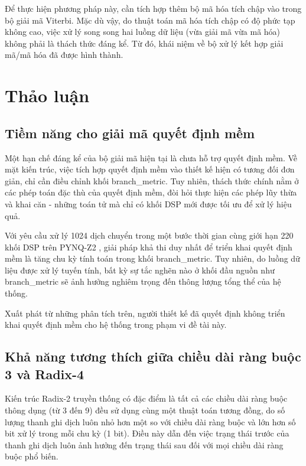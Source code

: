 \documentclass[../DoAn.tex]{subfiles}
\begin{document}
Để thực hiện phương pháp này, cần tích hợp thêm bộ mã hóa tích chập vào trong bộ giải mã Viterbi. Mặc dù vậy, do thuật toán mã hóa tích chập có độ phức tạp không cao, việc xử lý song song hai luồng dữ liệu (vừa giải mã vừa mã hóa) không phải là thách thức đáng kể. Từ đó, khái niệm về bộ xử lý kết hợp giải mã/mã hóa đã được hình thành.

\section{Thảo luận}

\subsection{Tiềm năng cho giải mã quyết định mềm}

Một hạn chế đáng kể của bộ giải mã hiện tại là chưa hỗ trợ quyết định mềm. Về mặt kiến trúc, việc tích hợp quyết định mềm vào thiết kế hiện có tương đối đơn giản, chỉ cần điều chỉnh khối branch\_metric. Tuy nhiên, thách thức chính nằm ở các phép toán đặc thù của quyết định mềm, đòi hỏi thực hiện các phép lũy thừa và khai căn - những toán tử mà chỉ có khối DSP mới được tối ưu để xử lý hiệu quả.

Với yêu cầu xử lý 1024 dịch chuyển trong một bước thời gian cùng giới hạn 220 khối DSP trên PYNQ-Z2 \cite{noauthor_aup_nodate}, giải pháp khả thi duy nhất để triển khai quyết định mềm là tăng chu kỳ tính toán trong khối branch\_metric. Tuy nhiên, do luồng dữ liệu được xử lý tuyến tính, bất kỳ sự tắc nghẽn nào ở khối đầu nguồn như branch\_metric sẽ ảnh hưởng nghiêm trọng đến thông lượng tổng thể của hệ thống.

Xuất phát từ những phân tích trên, người thiết kế đã quyết định không triển khai quyết định mềm cho hệ thống trong phạm vi đề tài này.

\subsection{Khả năng tương thích giữa chiều dài ràng buộc 3 và Radix-4}
\label{subsection:constraint_len3_radix_4}

Kiến trúc Radix-2 truyền thống có đặc điểm là tất cả các chiều dài ràng buộc thông dụng (từ 3 đến 9) đều sử dụng cùng một thuật toán tương đồng, do số lượng thanh ghi dịch luôn nhỏ hơn một so với chiều dài ràng buộc và lớn hơn số bit xử lý trong mỗi chu kỳ (1 bit). Điều này dẫn đến việc trạng thái trước của thanh ghi dịch luôn ảnh hưởng đến trạng thái sau đối với mọi chiều dài ràng buộc phổ biến. 
\end{document}
